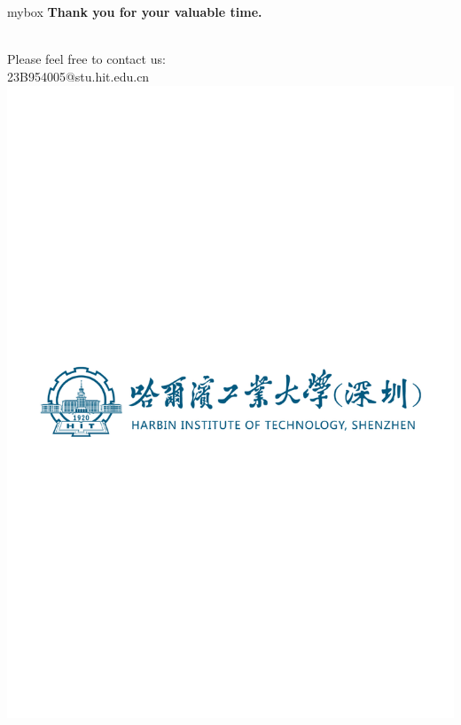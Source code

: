 \documentclass{beamer}
\begin{document}
\section*{}
\begin{frame}{}
  \begin{center}
      \begin{minipage}{1\textwidth}
          \begin{beamercolorbox}[wd=0.8\textwidth, rounded=true, shadow=true]{mybox}
              \centering \LARGE \textbf{Thank you for your valuable time.}
          \end{beamercolorbox}
      \end{minipage}
      \\[20pt]
      \LARGE Please feel free to contact us:
      \\[10pt]
      23B954005@stu.hit.edu.cn
      \\[20pt]
      \includegraphics[width=0.5\linewidth]{hitsz.pdf}
  \end{center}
\end{frame}

 


\end{document}
